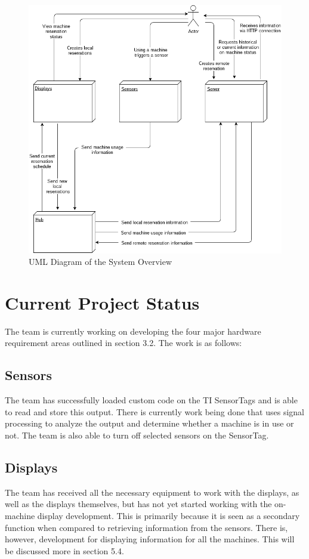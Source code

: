 \documentclass[letterpaper,11pt]{./templates/texMemo} %
\begin{document}
\begin{figure}[H]
    \centering
    \includegraphics[width=\textwidth]{uml/general_overview.png}
    \caption{UML Diagram of the System Overview}
    \label{fig:general_overview}
\end{figure}

\section{Current Project Status}	

The team is currently working on developing the four major hardware requirement areas outlined in section 3.2. The work is as follows:

\subsection{Sensors}
The team has successfully loaded custom code on the TI SensorTags and is able to read and store this output. There is currently work being done that uses signal processing to analyze the output and determine whether a machine is in use or not. The team is also able to turn off selected sensors on the SensorTag.

\subsection{Displays}
The team has received all the necessary equipment to work with the displays, as well as the displays themselves, but has not yet started working with the on-machine display development. This is primarily because it is seen as a secondary function when compared to retrieving information from the sensors. There is, however, development for displaying information for all the machines. This will be discussed more in section 5.4.
\end{document}
